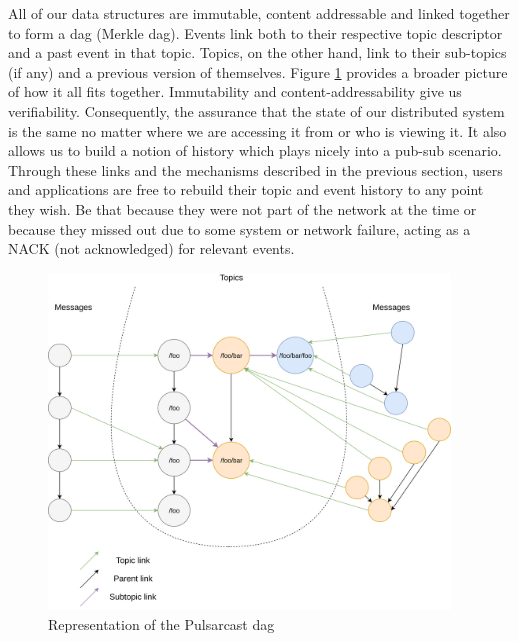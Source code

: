 All of our data structures are immutable, content addressable and linked
together to form a \acrlong{dag} (Merkle \acrshort{dag}). Events link both to
their respective topic descriptor and a past event in that topic. Topics, on
the other hand, link to their sub-topics (if any) and a previous version of
themselves.  Figure \ref{fig:pulsarcast-dag} provides a broader picture of how
it all fits together. Immutability and content-addressability give us
verifiability. Consequently, the assurance that the state of our distributed
system is the same no matter where we are accessing it from or who is viewing
it. It also allows us to build a notion of history which plays nicely into a
pub-sub scenario. Through these links and the mechanisms described in the
previous section, users and applications are free to rebuild their topic and
event history to any point they wish. Be that because they were not part of the
network at the time or because they missed out due to some system or network
failure, acting as a NACK (not acknowledged) for relevant events.

\begin{figure}[hb!]
  \centering
  \includegraphics[width=0.95\textwidth]{../images/pulsarcast-dag.png}
  \caption{Representation of the Pulsarcast \acrshort{dag}}
  \label{fig:pulsarcast-dag}
\end{figure}

